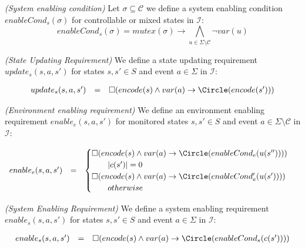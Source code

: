 \begin{definition}\label{def:sys-enabling-condition}\emph{(System enabling condition)}
Let $\sigma \subseteq \mathcal{C}$ we define a system enabling condition $enableCond_s(\sigma)$ for controllable or mixed states in $\mathcal{I}$:
\[
enableCond_s(\sigma) = mutex(\sigma) \rightarrow \bigwedge_{u \in \Sigma \setminus \mathcal{C}}\neg var(u)
\]
\end{definition}

\begin{definition}\label{def:state-upadting-requirement}\emph{(State Updating Requirement)}
We define a state updating requirement $update_s(s,a,s')$ for states $s, s' \in S$ and event $a \in \Sigma$ in $\mathcal{I}$:
\begin{footnotesize}
\[
\begin{array}{r c l}
update_s(s, a, s') &=& 
\square(encode(s) \wedge var(a) \rightarrow \Circle(encode(s')))\\
\end{array}
\]
\end{footnotesize}
\end{definition}

\begin{definition}\label{def:env-enabling-requirement}\emph{(Environment enabling requirement)}
We define an environment enabling requirement $enable_e(s, a, s')$ for monitored states $s, s' \in S$ and event $a \in \Sigma \setminus \mathcal{C}$ in $\mathcal{I}$:
\begin{footnotesize}
\[
\begin{array}{r c l}
enable_e(s, a, s') &=& 
\begin{cases}
\square(encode(s) \wedge var(a) \rightarrow \Circle(enableCond_e(u(s'')))) 
\\
\quad \quad |c(s')| = 0\\
\square(encode(s) \wedge var(a) \rightarrow \Circle(enableCond'_e(u(s')))) 
\\
\quad \quad otherwise\\
\end{cases}
\\
\end{array}
\]
\end{footnotesize}
\end{definition}

\begin{definition}\label{def:system-enablig-requirement}\emph{(System Enabling Requirement)}
We define a system enabling requirement $enable_s(s, a, s')$ for states $s, s' \in S$ and event $a \in \Sigma$ in $\mathcal{I}$:
\begin{footnotesize}
\[
\begin{array}{r c l}
enable_s(s, a, s') &=& 
\square(encode(s) \wedge var(a) \rightarrow \Circle(enableCond_s(c(s'))))\\
\end{array}
\]
\end{footnotesize}
\end{definition}

